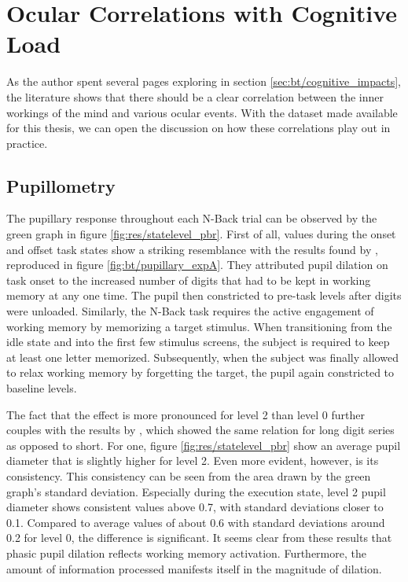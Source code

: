 \section{Ocular Correlations with Cognitive Load}

As the author spent several pages exploring in section \ref{sec:bt/cognitive_impacts}, the literature shows that there should be a clear correlation between the inner workings of the mind and various ocular events. With the dataset made available for this thesis, we can open the discussion on how these correlations play out in practice. 

\subsection{Pupillometry}

The pupillary response throughout each N-Back trial can be observed by the green graph in figure \ref{fig:res/statelevel_pbr}. First of all, values during the onset and offset task states show a striking resemblance with the results found by \textcite{kahneman1966}, reproduced in figure \ref{fig:bt/pupillary_expA}. They attributed pupil dilation on task onset to the increased number of digits that had to be kept in working memory at any one time. The pupil then constricted to pre-task levels after digits were unloaded. Similarly, the N-Back task requires the active engagement of working memory by memorizing a target stimulus. When transitioning from the idle state and into the first few stimulus screens, the subject is required to keep at least one letter memorized. Subsequently, when the subject was finally allowed to relax working memory by forgetting the target, the pupil again constricted to baseline levels.


The fact that the effect is more pronounced for level 2 than level 0 further couples with the results by \textcite{kahneman1966}, which showed the same relation for long digit series as opposed to short. For one, figure \ref{fig:res/statelevel_pbr} show an average pupil diameter that is slightly higher for level 2. Even more evident, however, is its consistency. This consistency can be seen from the area drawn by the green graph's standard deviation. Especially during the execution state, level 2 pupil diameter shows consistent values above 0.7, with standard deviations closer to 0.1. Compared to average values of about 0.6 with standard deviations around 0.2 for level 0, the difference is significant. It seems clear from these results that phasic pupil dilation reflects working memory activation. Furthermore, the amount of information processed manifests itself in the magnitude of dilation.

